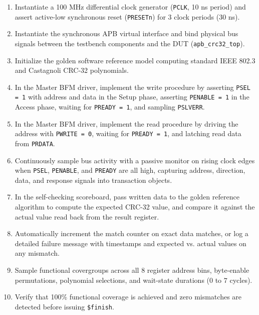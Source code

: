 \documentclass[11pt,a4paper,twoside]{article}
\begin{document}
\begin{enumerate}
    \setlength{\itemsep}{3.5pt}
    \setlength{\parskip}{0pt}
    \item Instantiate a 100 MHz differential clock generator (\texttt{PCLK}, 10 ns period) and assert active-low synchronous reset (\texttt{PRESETn}) for 3 clock periods (30 ns).
    \item Instantiate the synchronous APB virtual interface and bind physical bus signals between the testbench components and the DUT (\texttt{apb\_crc32\_top}).
    \item Initialize the golden software reference model computing standard IEEE 802.3 and Castagnoli CRC-32 polynomials.
    \item In the Master BFM driver, implement the write procedure by asserting \texttt{PSEL = 1} with address and data in the Setup phase, asserting \texttt{PENABLE = 1} in the Access phase, waiting for \texttt{PREADY = 1}, and sampling \texttt{PSLVERR}.
    \item In the Master BFM driver, implement the read procedure by driving the address with \texttt{PWRITE = 0}, waiting for \texttt{PREADY = 1}, and latching read data from \texttt{PRDATA}.
    \item Continuously sample bus activity with a passive monitor on rising clock edges when \texttt{PSEL}, \texttt{PENABLE}, and \texttt{PREADY} are all high, capturing address, direction, data, and response signals into transaction objects.
    \item In the self-checking scoreboard, pass written data to the golden reference algorithm to compute the expected CRC-32 value, and compare it against the actual value read back from the result register.
    \item Automatically increment the match counter on exact data matches, or log a detailed failure message with timestamps and expected vs. actual values on any mismatch.
    \item Sample functional covergroups across all 8 register address bins, byte-enable permutations, polynomial selections, and wait-state durations ($0$ to $7$ cycles).
    \item Verify that 100\% functional coverage is achieved and zero mismatches are detected before issuing \texttt{\$finish}.
\end{enumerate}

\clearpage

\end{document}
